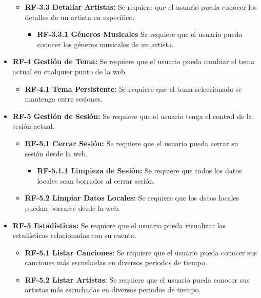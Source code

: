 \begin{itemize}
\begin{itemize}
                \item
                    \textbf{RF-3.3 Detallar Artistas:} Se requiere que el usuario pueda conocer los detalles de un artista en específico.
                    \begin{itemize}
                        \item \textbf{RF-3.3.1 Géneros Musicales} Se requiere que el usuario pueda conocer los géneros musicales de un artista. 
                    \end{itemize}
            \end{itemize}

    \item
        \textbf{RF-4 Gestión de Tema:} Se requiere que el usuario pueda cambiar el tema actual en cualquier punto de la web.
            \begin{itemize}
                \item 
                \textbf{RF-4.1 Tema Persistente:} Se requiere que el tema seleccionado se mantenga entre sesiones. 
            \end{itemize}
            
    \item
        \textbf{RF-5 Gestión de Sesión:} Se requiere que el usuario tenga el control de la sesión actual.
        \begin{itemize}
            \item
                \textbf{RF-5.1 Cerrar Sesión:} Se requiere que el usuario pueda cerrar su sesión desde la web.
                \begin{itemize}
                    \item
                    \textbf{RF-5.1.1 Limpieza de Sesión:} Se requiere que todos los datos locales sean borrados al cerrar sesión.
                \end{itemize}
            \item
                \textbf{RF-5.2 Limpiar Datos Locales:} Se requiere que los datos locales puedan borrarse desde la web.
        \end{itemize}
    
    \item
        \textbf{RF-5 Estadísticas:} Se requiere que el usuario pueda visualizar las estadísticas relacionadas con su cuenta.
        \begin{itemize}
            \item \textbf{RF-5.1 Listar Canciones}: Se requiere que el usuario pueda conocer sus canciones más escuchadas en diversos periodos de tiempo.
            \item \textbf{RF-5.2 Listar Artistas}: Se requiere que el usuario pueda conocer sus artistas más escuchadas en diversos periodos de tiempo.
        \end{itemize}
    

\end{itemize}
